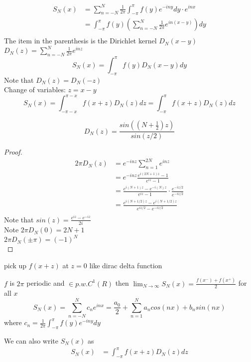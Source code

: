 \documentclass[answers,12pt,addpoints]{exam}
\begin{document}
\begin{align*}
    S_N(x) &= \sum_{n=-N}^{N} \frac{1}{2\pi} \int_{-\pi}^{\pi} f(y) e^{-iny} dy \cdot e^{inx}\\
    &= \int_{-\pi}^{\pi} f(y) \left( \sum_{n=-N}^{N} \frac{1}{2\pi} e^{in(x-y)} \right) dy\\
\end{align*}
The item in the parenthesis is the Dirichlet kernel $D_N(x-y)$\\
$D_N(z) = \sum_{n=-N}^{N} \frac{1}{2\pi} e^{inz}$\\
$$ S_N(x) = \int_{-\pi}^{\pi} f(y) D_N(x-y) dy$$
Note that $D_N(z) = D_N(-z)$\\
Change of variables: $z = x-y$\\
$$ S_N(x) = \int_{-\pi-x}^{\pi-x} f(x+z) D_N(z) dz = \int_{-\pi}^{\pi} f(x+z) D_N(z) dz$$
\begin{lemma}
    $$D_N(z) = \frac{sin((N+\frac{1}{2})z)}{sin(z/2)}$$
    \begin{proof}
        \begin{align*}
            2\pi D_N(z) &= e^{-inz} \sum_{n=1}^{2N}  e^{inz} \\
            &= e^{-inz} \frac{e^{i(2N+1)z} - 1}{e^{iz} - 1}\\
            &= \frac{e^{i(N+1)z} - e^{-i(N)z}}{e^{iz}-1} \cdot \frac{e^{-iz/2}}{e^{-iz/2}}\\
            &= \frac{e^{i(N+1/2)z} - e^{i(N+1/2)z}}{e^{iz/2} - e^{-iz/2}}\\
        \end{align*}
        Note that $sin(z) = \frac{e^{iz} - e^{-iz}}{2i}$\\
        Note $2\pi D_N(0) = 2N+1$\\
        $2\pi D_N(\pm \pi) = (-1)^N$\\
    \end{proof}
    pick up $f(x+z)$ at $z=0$ like dirac delta function\\
\end{lemma}
\begin{theorem}
    $f$ is $2\pi$ periodic and $\in p.w.C^1(R)$ then $\lim_{N \to \infty} S_N(x) = \frac{f(x^-) + f(x^+)}{2}$ for all $x$ \\
    $$S_N(x) = \sum_{n=-N}^{N} c_n e^{inx} = \frac{a_0}{2} + \sum_{n=1}^N a_n cos(nx) + b_n sin(nx)$$
    where $c_n = \frac{1}{2\pi} \int_{-\pi}^{\pi} f(y) e^{-iny} dy$\\
\end{theorem}
We can also write $S_N(x)$ as
\begin{align*}
    S_N(x) &= \int_{-\pi}^{\pi} f(x+z) D_N(z) dz\\
\end{align*}
\end{document}
